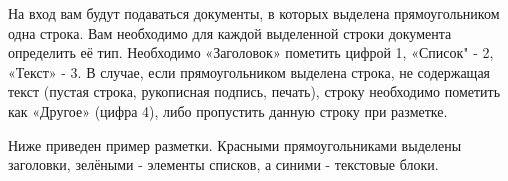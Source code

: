 \documentclass[a4paper,12pt]{article}
\begin{document}
На вход вам будут подаваться документы, в которых выделена прямоугольником одна строка. Вам необходимо для каждой выделенной строки документа определить её тип. Необходимо «Заголовок» пометить цифрой 1, «Список" - 2, «Текст» - 3. В случае, если прямоугольником выделена строка, не содержащая текст (пустая строка, рукописная подпись, печать), строку необходимо пометить как «Другое» (цифра 4), либо пропустить данную строку при разметке.

Ниже приведен пример разметки. Красными прямоугольниками выделены заголовки, зелёными - элементы списков, а синими - текстовые блоки.

\begin{center}
\end{center}

\newpage
 
\end{document}
